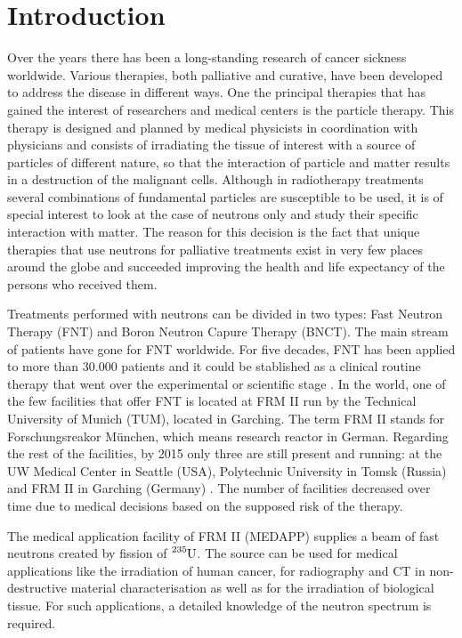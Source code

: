 \chapter{Introduction}

Over the years there has been a long-standing research of cancer sickness worldwide. Various therapies, both palliative and curative, have been developed to address the disease in different ways. One the principal therapies that has gained the interest of researchers and medical centers is the particle therapy. This therapy is designed and planned by medical physicists in coordination with physicians and consists of irradiating the tissue of interest with a source of particles of different nature, so that the interaction of particle and matter results in a destruction of the malignant cells. Although in radiotherapy treatments several combinations of fundamental particles are susceptible to be used, it is of special interest to look at the case of neutrons only and study their specific interaction with matter. The reason for this decision is the fact that unique therapies that use neutrons for palliative treatments exist in very few places around the globe and succeeded improving the health and life expectancy of the persons who received them. 

Treatments performed with neutrons can be divided in two types: Fast Neutron Therapy (FNT) and Boron Neutron Capure Therapy (BNCT). The main stream of patients have gone for FNT worldwide. For five decades, FNT has been applied to more than 30.000 patients and it could be stablished as a clinical routine therapy that went over the experimental or scientific stage \cite{wagner2015FNTstatus}.
In the world, one of the few facilities that offer FNT is located at FRM II run by the Technical University of Munich (TUM), located in Garching. The term FRM II stands for Forschungsreakor München, which means research reactor in German. Regarding the rest of the facilities, by 2015 only three are still present and running: at the UW Medical Center in Seattle (USA), Polytechnic University in Tomsk (Russia) and FRM II in Garching (Germany) \cite{wagner2015FNTstatus}. The number of facilities decreased over time due to  medical decisions based on the supposed risk of the therapy. 

The medical application facility of FRM II (MEDAPP) supplies a beam of fast neutrons created by fission of $\ce{^{235}{}U}$. The source can be used for medical applications like the irradiation of human cancer, for radiography and CT in non-destructive material characterisation as well as for the irradiation of biological tissue. For such applications, a detailed knowledge of the neutron spectrum is required.

